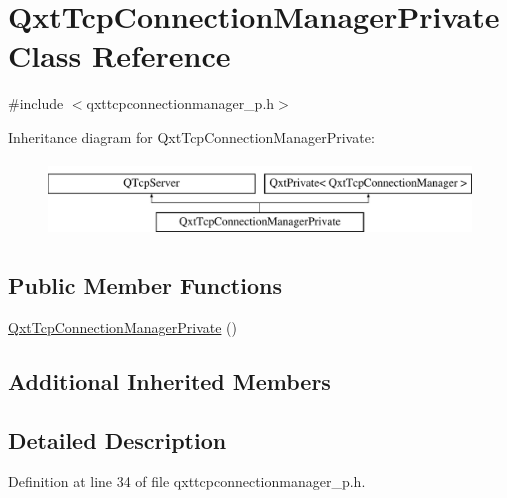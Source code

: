 \hypertarget{class_qxt_tcp_connection_manager_private}{\section{Qxt\-Tcp\-Connection\-Manager\-Private Class Reference}
\label{class_qxt_tcp_connection_manager_private}
}


{\ttfamily \#include $<$qxttcpconnectionmanager\-\_\-p.\-h$>$}

Inheritance diagram for Qxt\-Tcp\-Connection\-Manager\-Private\-:\begin{figure}[H]
\begin{center}
\leavevmode
\includegraphics[height=2.000000cm]{class_qxt_tcp_connection_manager_private}
\end{center}
\end{figure}
\subsection*{Public Member Functions}
\begin{DoxyCompactItemize}
\item 
\hyperlink{class_qxt_tcp_connection_manager_private_af2ed6c059950e31b11b9b7b65278d392}{Qxt\-Tcp\-Connection\-Manager\-Private} ()
\end{DoxyCompactItemize}
\subsection*{Additional Inherited Members}


\subsection{Detailed Description}


Definition at line 34 of file qxttcpconnectionmanager\-\_\-p.\-h.



